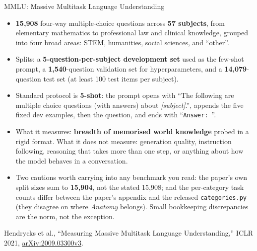 \begin{frame}{MMLU: Massive Multitask Language Understanding}
  \begin{itemize}\footnotesize\itemsep0.3em
    \item[\textcolor{red}{$\blacktriangleright$}] \textbf{15{,}908} four-way multiple-choice questions across \textbf{57 subjects}, from elementary mathematics to professional law and clinical knowledge, grouped into four broad areas: STEM, humanities, social sciences, and ``other''.
    \item[\textcolor{red}{$\blacktriangleright$}] Splits: a \textbf{5-question-per-subject development set} used as the few-shot prompt, a \textbf{1{,}540}-question validation set for hyperparameters, and a \textbf{14{,}079}-question test set (at least 100 test items per subject).
    \item[\textcolor{red}{$\blacktriangleright$}] Standard protocol is \textbf{5-shot}: the prompt opens with ``The following are multiple choice questions (with answers) about \textit{[subject]}.'', appends the five fixed dev examples, then the question, and ends with ``\texttt{Answer: }''.
    \item[\textcolor{red}{$\blacktriangleright$}] What it measures: \textbf{breadth of memorised world knowledge} probed in a rigid format. What it does not measure: generation quality, instruction following, reasoning that takes more than one step, or anything about how the model behaves in a conversation.
    \item[\textcolor{red}{$\blacktriangleright$}] Two cautions worth carrying into any benchmark you read: the paper's own split sizes sum to \textbf{15{,}904}, not the stated 15{,}908; and the per-category task counts differ between the paper's appendix and the released \texttt{categories.py} (they disagree on where \textit{Anatomy} belongs). Small bookkeeping discrepancies are the norm, not the exception.
  \end{itemize}
  \vspace{0.15em}
  {\scriptsize Hendrycks et al., ``Measuring Massive Multitask Language Understanding,'' ICLR 2021, \href{https://arxiv.org/abs/2009.03300v3}{arXiv:2009.03300v3}.}
\end{frame}

